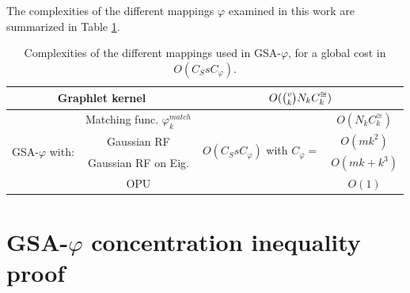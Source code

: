 

The complexities of the different mappings $\varphi$ examined in this work are summarized in Table \ref{tab:cost}.

\begin{table}
\centering
\begin{tabular}{|c|c|c|c|}
\hline
\multicolumn{2}{|c|}{Graphlet kernel} & \multicolumn{2}{|c|}{$O(\tbinom{v}{k} N_k C^{\cong}_k)$} \\ \hline \hline
%
\multirow{4}{*}{GSA-$\varphi$ with:} & Matching func. $\varphi^{match}_k$ & \multirow{4}{*}{$O(C_S s C_\varphi)$ with $C_\varphi=$ } & $O(N_k C^{\cong}_k)$ \\
& Gaussian RF & & $O(m k^2)$ \\ 
& Gaussian RF on Eig. & & $O(m k + k^3)$ \\ 
& OPU  & & $O(1)$ \\ \hline
\end{tabular}
\caption{Complexities of the different mappings used in GSA-$\varphi$, for a global cost in $O(C_S s C_ \varphi)$.}
\label{tab:cost}
\end{table}

\section{GSA-$\varphi$ concentration inequality proof}
\label{section:proof}

